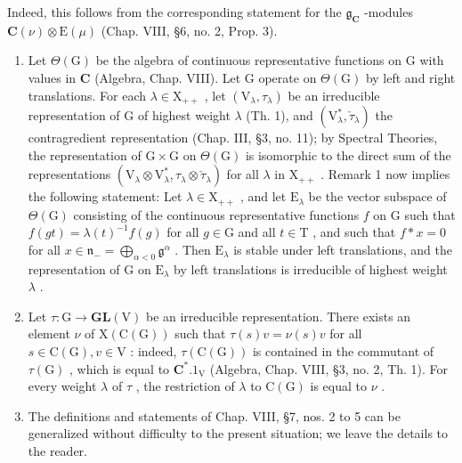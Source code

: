 Indeed, this follows from the corresponding statement for the \(\mathfrak{g}_{\mathbf{C}}\) -modules \(\mathbf{C}(\nu) \otimes \mathrm{E}(\mu)\) (Chap. VIII, §6, no. 2, Prop. 3).

\begin{enumerate}
\def\labelenumi{\arabic{enumi})}
\setcounter{enumi}{1}
\item
  Let \(\Theta(\mathrm{G})\) be the algebra of continuous representative functions on \(\mathrm{G}\) with values in \(\mathbf{C}\) (Algebra, Chap. VIII). Let \(\mathrm{G}\) operate on \(\Theta(\mathrm{G})\) by left and right translations. For each \(\lambda \in \mathrm{X}_{++}\) , let \((\mathrm{V}_{\lambda}, \tau_{\lambda})\) be an irreducible representation of \(\mathrm{G}\) of highest weight \(\lambda\) (Th. 1), and \((\mathrm{V}_{\lambda}^{*}, \check{\tau}_{\lambda})\) the contragredient representation (Chap. III, §3, no. 11); by Spectral Theories, the representation of \(\mathrm{G} \times \mathrm{G}\) on \(\Theta(\mathrm{G})\) is isomorphic to the direct sum of the representations \((\mathrm{V}_{\lambda} \otimes \mathrm{V}_{\lambda}^{*}, \tau_{\lambda} \otimes \check{\tau}_{\lambda})\) for all \(\lambda\) in \(\mathrm{X}_{++}\) . Remark 1 now implies the following statement: Let \(\lambda \in \mathrm{X}_{++}\) , and let \(\mathrm{E}_{\lambda}\) be the vector subspace of \(\Theta(\mathrm{G})\) consisting of the continuous representative functions \(f\) on \(\mathrm{G}\) such that \(f(gt) = \lambda(t)^{-1} f(g)\) for all \(g \in \mathrm{G}\) and all \(t \in \mathrm{T}\) , and such that \(f * x = 0\) for all \(x \in \mathfrak{n}_{-} = \bigoplus_{\alpha < 0} \mathfrak{g}^{\alpha}\) . Then \(\mathrm{E}_{\lambda}\) is stable under left translations, and the representation of \(\mathrm{G}\) on \(\mathrm{E}_{\lambda}\) by left translations is irreducible of highest weight \(\lambda\) .
\item
  Let \(\tau : \mathrm{G} \to \mathbf{GL}(\mathrm{V})\) be an irreducible representation. There exists an element \(\nu\) of \(\mathrm{X}(\mathrm{C}(\mathrm{G}))\) such that \(\tau(s)v = \nu(s)v\) for all \(s \in \mathrm{C}(\mathrm{G}), v \in \mathrm{V}\) : indeed, \(\tau(\mathrm{C}(\mathrm{G}))\) is contained in the commutant of \(\tau(\mathrm{G})\) , which is equal to \(\mathbf{C}^*.1_{\mathrm{V}}\) (Algebra, Chap. VIII, §3, no. 2, Th. 1). For every weight \(\lambda\) of \(\tau\) , the restriction of \(\lambda\) to \(\mathrm{C}(\mathrm{G})\) is equal to \(\nu\) .
\item
  The definitions and statements of Chap. VIII, §7, nos. 2 to 5 can be generalized without difficulty to the present situation; we leave the details to the reader.
\end{enumerate}

